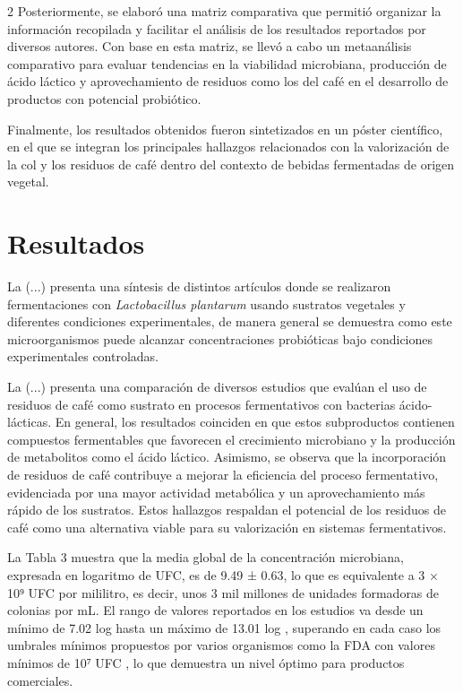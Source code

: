 \begin{multicols}{2}
Posteriormente, se elaboró una matriz comparativa que permitió organizar la información recopilada y facilitar el análisis de los resultados reportados por diversos autores. Con base en esta matriz, se llevó a cabo un metaanálisis comparativo para evaluar tendencias en la viabilidad microbiana, producción de ácido láctico y aprovechamiento de residuos como los del café en el desarrollo de productos con potencial probiótico. 

Finalmente, los resultados obtenidos fueron sintetizados en un póster científico, en el que se integran los principales hallazgos relacionados con la valorización de la col y los residuos de café dentro del contexto de bebidas fermentadas de origen vegetal.

\section{Resultados}

La (...) presenta una síntesis de distintos artículos donde se realizaron fermentaciones con \textit{Lactobacillus plantarum} usando sustratos vegetales y diferentes condiciones experimentales, de manera general se demuestra como este microorganismos puede alcanzar concentraciones probióticas bajo condiciones experimentales controladas.


La (...) presenta una comparación de diversos estudios que evalúan el uso de residuos de café como sustrato en procesos fermentativos con bacterias ácido-lácticas. En general, los resultados coinciden en que estos subproductos contienen compuestos fermentables que favorecen el crecimiento microbiano y la producción de metabolitos como el ácido láctico. Asimismo, se observa que la incorporación de residuos de café contribuye a mejorar la eficiencia del proceso fermentativo, evidenciada por una mayor actividad metabólica y un aprovechamiento más rápido de los sustratos. Estos hallazgos respaldan el potencial de los residuos de café como una alternativa viable para su valorización en sistemas fermentativos. 

    
La Tabla 3 muestra que la media global de la concentración microbiana, expresada en logaritmo de UFC, es de 9.49 ± 0.63, lo que es equivalente  a 3 × 10⁹ UFC por mililitro, es decir, unos 3 mil millones de unidades formadoras de colonias por mL. El rango de valores reportados en los estudios va desde un mínimo de 7.02 log hasta un máximo de 13.01 log , superando en cada caso los umbrales mínimos propuestos por varios organismos como la FDA con valores mínimos de 10⁷ UFC , lo que demuestra  un nivel óptimo para productos comerciales.


\end{multicols}
